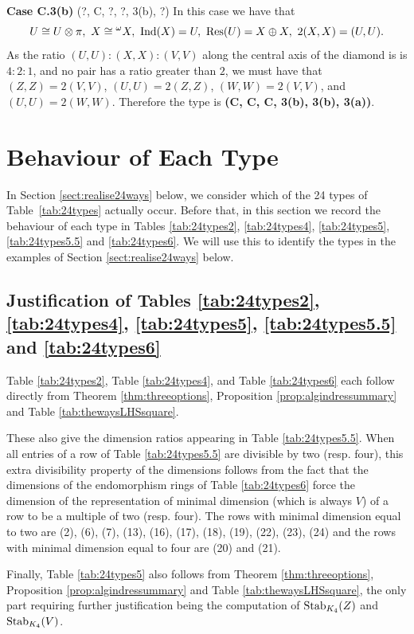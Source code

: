 \vspace{0.5em}
\noindent \textbf{Case C.3(b)} (?, C, ?, ?, 3(b), ?)
In this case we have that
\[
U \cong U \otimes \pi, \ X \cong {}^{\omega} X, \ \Ind(X) = U, \ \Res(U) = X \oplus X, \ 2(X,X) = (U,U).
\]
As the ratio $(U,U) : (X,X) : (V,V)$ along the central axis of the diamond is is $4:2:1$, and no pair has a ratio greater than $2$, we must have that $(Z,Z) = 2(V,V)$, $(U,U) = 2(Z,Z)$, $(W,W) = 2 (V,V)$, and $(U,U) = 2(W,W)$. Therefore the type is \textbf{(C, C, C, 3(b), 3(b), 3(a))}. \qedsymbol

\section{Behaviour of Each Type}

In Section \ref{sect:realise24ways} below, we consider which of the 24 types of Table~\ref{tab:24types} actually occur. Before that, in this section we record the behaviour of each type in Tables \ref{tab:24types2}, \ref{tab:24types4}, \ref{tab:24types5}, \ref{tab:24types5.5} and \ref{tab:24types6}. We will use this to identify the types in the examples of Section \ref{sect:realise24ways} below.

\subsection{Justification of Tables \ref{tab:24types2}, \ref{tab:24types4}, \ref{tab:24types5}, \ref{tab:24types5.5} and \ref{tab:24types6}}

Table \ref{tab:24types2}, Table \ref{tab:24types4}, and Table \ref{tab:24types6} each follow directly from Theorem \ref{thm:threeoptions}, Proposition \ref{prop:algindressummary} and Table \ref{tab:thewaysLHSsquare}. 

These also give the dimension ratios appearing in Table \ref{tab:24types5.5}. When all entries of a row of Table \ref{tab:24types5.5} are divisible by two (resp. four), this extra divisibility property of the dimensions follows from the fact that the dimensions of the endomorphism rings of Table \ref{tab:24types6} force the dimension of the representation of minimal dimension (which is always $V$) of a row to be a multiple of two (resp. four). The rows with minimal dimension equal to two are (2), (6), (7), (13), (16), (17), (18), (19), (22), (23), (24) and the rows with minimal dimension equal to four are (20) and (21).

Finally, Table \ref{tab:24types5} also follows from Theorem \ref{thm:threeoptions}, Proposition \ref{prop:algindressummary} and Table \ref{tab:thewaysLHSsquare}, the only part requiring further justification being the computation of $\operatorname{Stab}_{K_4}(Z)$ and $\operatorname{Stab}_{K_4}(V)$.

